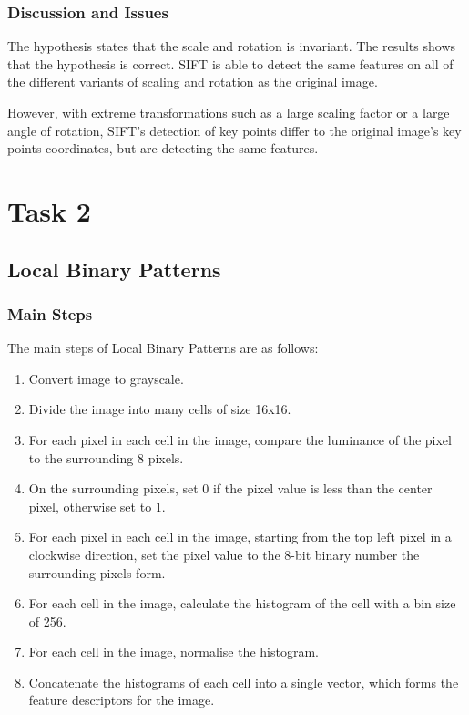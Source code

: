 \documentclass[conference]{IEEEtran}
\begin{document}
\subsubsection{Discussion and Issues}
The hypothesis states that the scale and rotation is invariant. The results
shows that the hypothesis is correct. SIFT is able to detect the same features
on all of the different variants of scaling and rotation as the original
image.

However, with extreme transformations such as a large scaling factor
or a large angle of rotation, SIFT's detection of key points differ to the
original image's key points coordinates, but are detecting the same features.


\section{Task 2}
\subsection{Local Binary Patterns}
\subsubsection{Main Steps}
The main steps of Local Binary Patterns are as follows:
\begin{enumerate}
    \item Convert image to grayscale.
    \item Divide the image into many cells of size 16x16\cite{lbp-3}.
    \item For each pixel in each cell in the image, compare the luminance of
          the pixel to the surrounding 8 pixels.
    \item On the surrounding pixels, set 0 if the pixel value is less than the
          center pixel, otherwise set to 1.
    \item For each pixel in each cell in the image, starting from the top left
          pixel in a clockwise direction, set the pixel value to the 8-bit
          binary number the surrounding pixels form\cite{lbp-1}\cite{lbp-2}.
    \item For each cell in the image, calculate the histogram of the cell with
          a bin size of 256.
    \item For each cell in the image, normalise the histogram.
    \item Concatenate the histograms of each cell into a single vector, which
          forms the feature descriptors for the image\cite{lbp-3}\cite{lbp-1}.
\end{enumerate}
\end{document}
